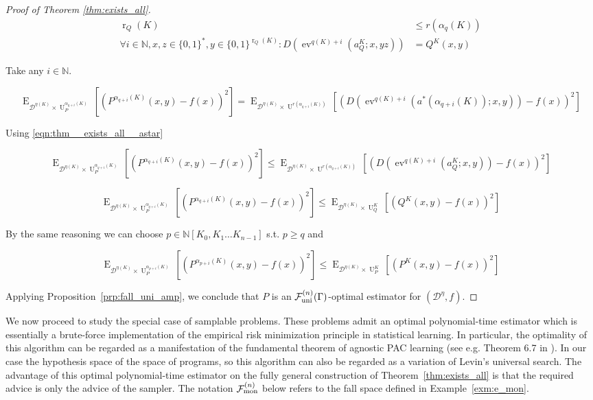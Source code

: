\documentclass[11pt]{article}
\numberwithin{equation}{section}
\theoremstyle{definition}
\theoremstyle{plain}
\newcommand{\Bool}{\{0,1\}}
\newcommand{\Words}{{\Bool^*}}
\DeclareMathOperator{\E}{E}
\DeclareMathOperator{\Ev}{ev}
\DeclareMathOperator{\R}{r}
\DeclareMathOperator{\Un}{U}
\newcommand{\Nats}{\mathbb{N}}
\newcommand{\NatPoly}{\Nats[K_0, K_1 \ldots K_{n-1}]}
\newcommand{\Dist}{\mathcal{D}}
\newcommand{\Fall}{\mathcal{F}}
\newcommand{\BoolR}[1]{\Bool^{\R_{#1}(K)}}
\newcommand{\FallU}{{\Fall_{\textnormal{uni}}^{(n)}}}
\newcommand{\FallM}{\Fall_{\textnormal{mon}}^{(n)}}
\begin{document}
\begin{proof}[Proof of Theorem \ref{thm:exists_all}]
\begin{align}
\label{eqn:thm__exists_all__q_rnd}\R_Q(K) &\leq r(\alpha_q(K)) \\
\label{eqn:thm__exists_all__q_adv}\forall i \in \Nats, x,z \in \Words, y \in \BoolR{Q}: D(\Ev^{q(K)+i}(a_Q^K;x,yz))&=Q^K(x,y)
\end{align}

Take any ${i \in \Nats}$.

\[\E_{ \Dist^{\eta(K)} \times \Un_P^{\alpha_{q+i}(K)}}[(P^{\alpha_{q+i}(K)}(x,y)-f(x))^2]=\E_{ \Dist^{\eta(K)} \times \Un^{r(\alpha_{q+i}(K))}}[(D(\Ev^{q(K)+i}(a^*(\alpha_{q+i}(K));x,y))-f(x))^2]\]

Using \ref{eqn:thm__exists_all__astar}

\[\E_{ \Dist^{\eta(K)} \times \Un_P^{\alpha_{q+i}(K)}}[(P^{\alpha_{q+i}(K)}(x,y)-f(x))^2] \leq \E_{\Dist^{\eta(K)} \times \Un^{r(\alpha_{q+i}(K))}}[(D(\Ev^{q(K)+i}(a_Q^K;x,y))-f(x))^2]\]

\[\E_{ \Dist^{\eta(K)} \times \Un_P^{\alpha_{q+i}(K)}}[(P^{\alpha_{q+i}(K)}(x,y)-f(x))^2] \leq \E_{\Dist^{\eta(K)} \times \Un_Q^K}[(Q^K(x,y)-f(x))^2]\]

By the same reasoning we can choose ${p \in \NatPoly}$ s.t. ${p \geq q}$ and

\[\E_{ \Dist^{\eta(K)} \times \Un_P^{\alpha_{p+i}(K)}}[(P^{\alpha_{p+i}(K)}(x,y)-f(x))^2] \leq \E_{\Dist^{\eta(K)} \times \Un_P^K}[(P^K(x,y)-f(x))^2]\]

Applying Proposition~\ref{prp:fall_uni_amp}, we conclude that ${P}$ is an ${\FallU(\Gamma)}$-optimal estimator for ${(\Dist^\eta,f)}$.
%
\end{proof}

We now proceed to study the special case of samplable problems. These problems admit an optimal polynomial-time estimator which is essentially a brute-force implementation of the empirical risk minimization principle in statistical learning. In particular, the optimality of this algorithm can be regarded as a manifestation of the fundamental theorem of agnostic PAC learning (see e.g. Theorem 6.7 in \cite{Shalev-Shwartz_2014}). In our case the hypothesis space of the space of programs, so this algorithm can also be regarded as a variation of Levin's universal search. The advantage of this optimal polynomial-time estimator on the fully general construction of Theorem~\ref{thm:exists_all} is that the required advice is only the advice of the sampler. The notation $\FallM$ below refers to the fall space defined in Example~\ref{exm:e_mon}.
\end{document}
